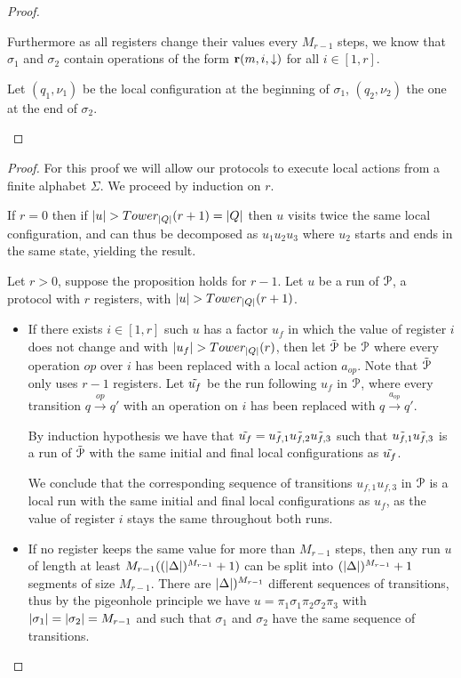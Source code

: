 \begin{proof}
\begin{itemize}
		Furthermore as all registers change their values every $M_{r-1}$ steps, we know that $\sigma_1$ and $\sigma_2$ contain operations of the form $\textbf{r}(m, i, \downarrow)$ for all $i \in [1,r]$.
		
		Let $(q_1, \nu_1)$ be the local configuration at the beginning of $\sigma_1$, $(q_2, \nu_2)$ the one at the end of $\sigma_2$.
	\end{itemize}
	
\end{proof}

\iffalse
\begin{proof}
	For this proof we will allow our protocols to execute local actions from a finite alphabet $\Sigma$.
	We proceed by induction on $r$.
	
	If $r=0$ then if $|u| > Tower_{|Q|}(r+1) = |Q|$ then $u$ visits twice the same local configuration, and can thus be decomposed as $u_1 u_2 u_3$ where $u_2$ starts and ends in the same state, yielding the result. 
	
	Let $r>0$, suppose the proposition holds for $r-1$.
	Let $u$ be a run of $\mathcal{P}$, a protocol with $r$ registers, with $|u| > Tower_{|Q|}(r+1)$.
	
	\begin{itemize}
		\item If there exists $i \in [1,r]$ such $u$ has a factor $u_f$ in which the value of register $i$ does not change and with $|u_f| > Tower_{|Q|}(r)$, then let $\Tilde{\mathcal{P}}$ be $\mathcal{P}$ where every operation $op$ over $i$ has been replaced with a local action $a_{op}$. Note that $\Tilde{\mathcal{P}}$ only uses $r-1$ registers. 
		Let $\Tilde{u_f}$ be the run following $u_f$ in $\mathcal{P}$, where every transition $q \xrightarrow{op} q'$ with an operation on $i$ has been replaced with $q \xrightarrow{a_{op}} q'$.
		
		By induction hypothesis we have that $\Tilde{u_f} = \Tilde{u_{f,1}} \Tilde{u_{f,2}}\Tilde{u_{f,3}}$ such that  $\Tilde{u_{f,1}}\Tilde{u_{f,3}}$ is a run of $\Tilde{\mathcal{P}}$ with the same initial and final local configurations as $\Tilde{u_f}$. 
		
		We conclude that the corresponding sequence of transitions $u_{f,1}u_{f,3}$ in $\mathcal{P}$ is a local run with the same initial and final local configurations as $u_f$, as the value of register $i$ stays the same throughout both runs.
		
		\item If no register keeps the same value for more than $M_{r-1}$ steps, then any run $u$ of length at least $M_{r-1} ((|\Delta|)^{M_{r-1}} +1)$ can be split into $(|\Delta|)^{M_{r-1}} +1$ segments of size $M_{r-1}$. There are $|\Delta|)^{M_{r-1}}$ different sequences of transitions, thus by the pigeonhole principle we have $u = \pi_1 \sigma_1 \pi_2 \sigma_2 \pi_3$ with $|\sigma_1| = |\sigma_2| = M_{r-1}$ and such that  $\sigma_1$ and $\sigma_2$ have the same sequence of transitions.
		

\end{itemize}
\end{proof}
